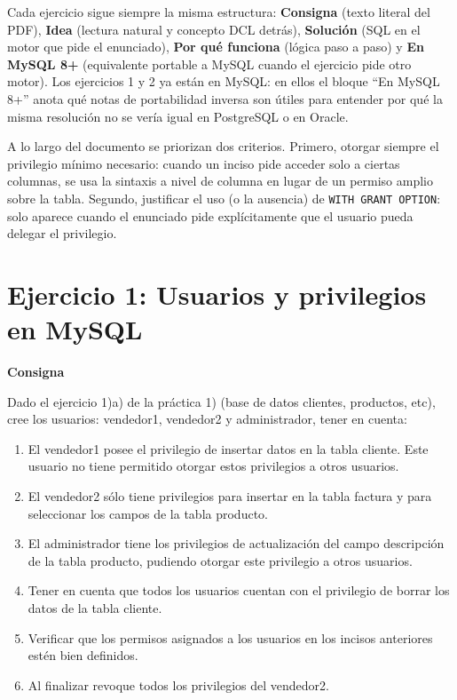 \documentclass[11pt,a4paper]{article}
\newcommand{\itemcabecera}[1]{\noindent\textbf{#1}\par\medskip}
\newcommand{\bloqueConsigna}{\itemcabecera{Consigna}}
\begin{document}
Cada ejercicio sigue siempre la misma estructura: \textbf{Consigna} (texto literal del PDF), \textbf{Idea} (lectura natural y concepto DCL detrás), \textbf{Solución} (SQL en el motor que pide el enunciado), \textbf{Por qué funciona} (lógica paso a paso) y \textbf{En MySQL 8+} (equivalente portable a MySQL cuando el ejercicio pide otro motor). Los ejercicios 1 y 2 ya están en MySQL: en ellos el bloque ``En MySQL 8+'' anota qué notas de portabilidad inversa son útiles para entender por qué la misma resolución no se vería igual en PostgreSQL o en Oracle.

A lo largo del documento se priorizan dos criterios. Primero, otorgar siempre el privilegio mínimo necesario: cuando un inciso pide acceder solo a ciertas columnas, se usa la sintaxis a nivel de columna en lugar de un permiso amplio sobre la tabla. Segundo, justificar el uso (o la ausencia) de \texttt{WITH GRANT OPTION}: solo aparece cuando el enunciado pide explícitamente que el usuario pueda delegar el privilegio.

\section{Ejercicio 1: Usuarios y privilegios en MySQL}

\bloqueConsigna

Dado el ejercicio 1)a) de la práctica 1) (base de datos clientes, productos, etc), cree los usuarios: vendedor1, vendedor2 y administrador, tener en cuenta:

\begin{enumerate}[label=\alph*),leftmargin=*]
    \item El vendedor1 posee el privilegio de insertar datos en la tabla cliente. Este usuario no tiene permitido otorgar estos privilegios a otros usuarios.
    \item El vendedor2 sólo tiene privilegios para insertar en la tabla factura y para seleccionar los campos de la tabla producto.
    \item El administrador tiene los privilegios de actualización del campo descripción de la tabla producto, pudiendo otorgar este privilegio a otros usuarios.
    \item Tener en cuenta que todos los usuarios cuentan con el privilegio de borrar los datos de la tabla cliente.
    \item Verificar que los permisos asignados a los usuarios en los incisos anteriores estén bien definidos.
    \item Al finalizar revoque todos los privilegios del vendedor2.
\end{enumerate}
\end{document}
